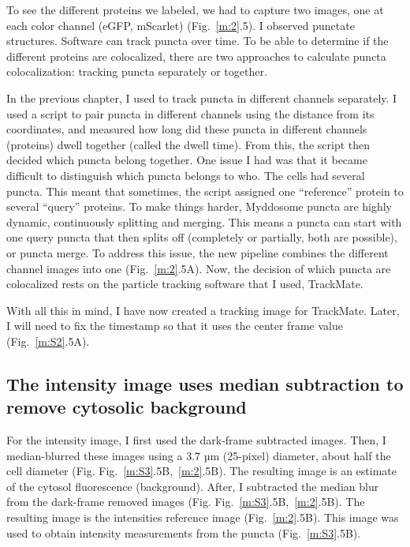 To see the different proteins we labeled, we had to capture two images, one at each color channel (eGFP, mScarlet) (Fig.~\ref{m:2}.5). I observed punctate structures. Software can track puncta over time. To be able to determine if the different proteins are colocalized, there are two approaches to calculate puncta colocalization: tracking puncta separately or together.

In the previous chapter, I used to track puncta in different channels separately. I used a script to pair puncta in different channels using the distance from its coordinates, and measured how long did these puncta in different channels (proteins) dwell together (called the dwell time). From this, the script then decided which puncta belong together. One issue I had was that it became difficult to distinguish which puncta belongs to who. The cells had several puncta. This meant that sometimes, the script assigned one “reference” protein to several “query” proteins. To make things harder, Myddosome puncta are highly dynamic, continuously splitting and merging. This means a puncta can start with one query puncta that then splits off (completely or partially, both are possible), or puncta merge. To address this issue, the new pipeline combines the different channel images into one (Fig.~\ref{m:2}.5A). Now, the decision of which puncta are colocalized rests on the particle tracking software that I used, TrackMate.

With all this in mind, I have now created a tracking image for TrackMate. Later, I will need to fix the timestamp so that it uses the center frame value (Fig.~\ref{m:S2}.5A).

\subsection{The intensity image uses median subtraction to remove cytosolic background}
For the intensity image, I first used the dark-frame subtracted images. Then, I median-blurred these images using a 3.7 µm (25-pixel) diameter, about half the cell diameter (Fig. Fig.~\ref{m:S3}.5B,~\ref{m:2}.5B). The resulting image is an estimate of the cytosol fluorescence (background). After, I subtracted the median blur from the dark-frame removed images (Fig. Fig.~\ref{m:S3}.5B,~\ref{m:2}.5B). The resulting image is the intensities reference image (Fig.~\ref{m:2}.5B). This image was used to obtain intensity measurements from the puncta (Fig.~\ref{m:S3}.5B).


